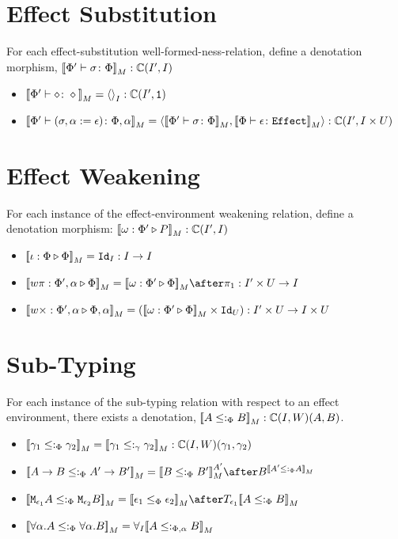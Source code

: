 \documentclass{report}
\begin{document}
\section{Effect Substitution}

For each effect-substitution well-formed-ness-relation, define a denotation morphism, ${\bf [\![}\Phi' \vdash \sigma \colon \Phi{\bf ]\!]}_M: \mathbb{C}(I', I)$

\begin{itemize}
    \item ${\bf [\![}\Phi' \vdash \diamond \colon \diamond{\bf ]\!]}_M = \left\langle\right\rangle_{I}: \mathbb{C}(I', \texttt{1})$
    \item ${\bf [\![}\Phi' \vdash (\sigma, \alpha:=\epsilon) \colon \Phi,\alpha{\bf ]\!]}_M = \left\langle{\bf [\![}\Phi' \vdash \sigma \colon \Phi{\bf ]\!]}_M, {\bf [\![}\Phi \vdash \epsilon \colon \texttt{Effect}{\bf ]\!]}_M\right\rangle: \mathbb{C}(I', I\times U)$
\end{itemize}
\section{Effect Weakening}

For each instance of the effect-environment weakening relation, define a denotation morphism: ${\bf [\![}\omega : \Phi' \triangleright P{\bf ]\!]}_M: \mathbb{C}(I', I)$

\begin{itemize}
    \item ${\bf [\![}\iota : \Phi \triangleright \Phi{\bf ]\!]}_M = \texttt{Id}_{I}: I \rightarrow I$
    \item $\deno{\wrel{w\pi}{\P',\a}{\P}} = \deno{\wrelw{\P'}{\P}}\after \p: I'\times U\rightarrow I$
    \item ${\bf [\![}w\times : \Phi',\alpha \triangleright \Phi,\alpha{\bf ]\!]}_M = ({\bf [\![}\omega : \Phi' \triangleright \Phi{\bf ]\!]}_M\times \texttt{Id}_{U}): I'\times U\rightarrow I\times U$
\end{itemize}
\section{Sub-Typing}
For each instance of the sub-typing relation with respect  to an effect environment, there exists a denotation, ${\bf [\![}A\leq:_\Phi B{\bf ]\!]}_M: \mathbb{C}(I, W)(A, B)$.

\begin{itemize}
    \item ${\bf [\![}\gamma_1\leq:_\Phi \gamma_2{\bf ]\!]}_M = {\bf [\![}\gamma_1\leq:_\gamma \gamma_2{\bf ]\!]}_M : \mathbb{C}(I, W)(\gamma_1, \gamma_2)$
    \item $\deno{\ab \subtypep \fntype{A'}{B'}} = \deno{B\subtypep B'}^{A'}\after B^{\deno{A'\subtypep A}}$
    \item $\deno{\M{\e_1}{A}\subtypep\M{\e_2}{B}} = \deno{\e_1\subeffectp\e_2}\after\T{\e_1}{\deno{A\subtypep B}}$
    \item ${\bf [\![}\forall \alpha. A\leq:_\Phi\forall \alpha. B{\bf ]\!]}_M = \forall_I{{\bf [\![}A\leq:_{\Phi, \alpha} B{\bf ]\!]}_M}$
\end{itemize}
\end{document}

